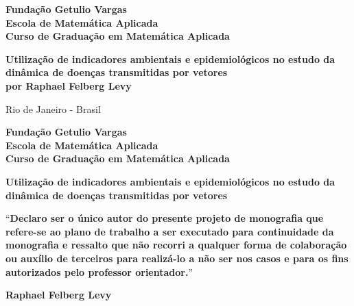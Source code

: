 \documentclass[12pt]{article}
\begin{document}
\begin{titlepage}
\begin{center}
\textbf{\LARGE Fundação Getulio Vargas}\\ 
\textbf{\LARGE Escola de Matemática Aplicada}\\
\textbf{\LARGE Curso de Graduação em Matemática Aplicada}

\par
\vspace{170pt}
\textbf{\Large Utilização de indicadores ambientais e epidemiológicos no estudo da dinâmica de doenças transmitidas por vetores}\\
\vspace{80pt}
\textbf{\Large por Raphael Felberg Levy}\\
\end{center}

\par
\vfill
\begin{center}
{{\normalsize Rio de Janeiro - Brasil}\\
{\normalsize \the\year}}
\end{center}
\end{titlepage}

\thispagestyle{empty}

\newpage
\begin{center}
\textbf{\LARGE Fundação Getulio Vargas}\\ 
\textbf{\LARGE Escola de Matemática Aplicada}\\
\textbf{\LARGE Curso de Graduação em Matemática Aplicada}

\par
\vspace{100pt}
\textbf{\Large Utilização de indicadores ambientais e epidemiológicos no estudo da dinâmica de doenças transmitidas por vetores}


\par
\vspace{65pt}
``\textbf{Declaro ser o único autor do presente projeto de
monografia que refere-se ao plano de trabalho a ser executado para continuidade da monografia e ressalto que não recorri a qualquer forma de colaboração ou auxílio de terceiros para realizá-lo a não ser nos casos e para os fins autorizados pelo professor orientador.}''
\end{center}

\par
\vspace{65pt}
\begin{center}


\hrulefill

\vspace{5pt}
\textbf{\Large Raphael Felberg Levy}
\end{center}
\end{document}
